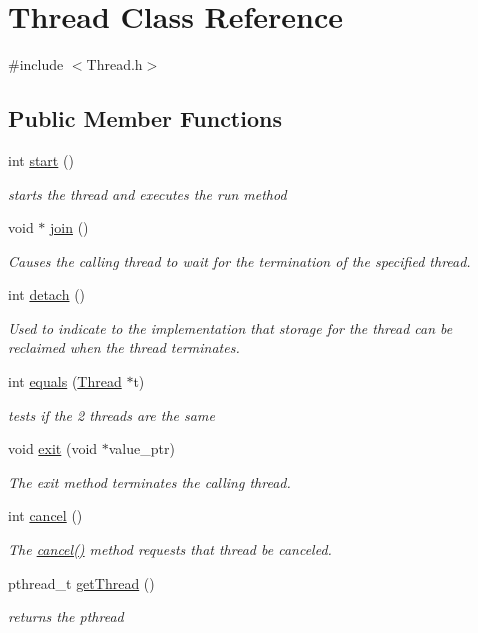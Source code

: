\hypertarget{class_thread}{
\section{\-Thread \-Class \-Reference}
\label{class_thread}
}


{\ttfamily \#include $<$\-Thread.\-h$>$}

\subsection*{\-Public \-Member \-Functions}
\begin{DoxyCompactItemize}
\item 
int \hyperlink{class_thread_a7d563f3201d081af8cc24ea552c6a4e4}{start} ()
\begin{DoxyCompactList}\small\item\em starts the thread and executes the run method \end{DoxyCompactList}\item 
void $\ast$ \hyperlink{class_thread_a9fc97f64df2c041f08f01e8ade638046}{join} ()
\begin{DoxyCompactList}\small\item\em \-Causes the calling thread to wait for the termination of the specified thread. \end{DoxyCompactList}\item 
int \hyperlink{class_thread_a2a08036a4598cfc554114fee9d0e8485}{detach} ()
\begin{DoxyCompactList}\small\item\em \-Used to indicate to the implementation that storage for the thread can be reclaimed when the thread terminates. \end{DoxyCompactList}\item 
int \hyperlink{class_thread_af10ab7827d62665de0ebc5afbfcf1109}{equals} (\hyperlink{class_thread}{\-Thread} $\ast$t)
\begin{DoxyCompactList}\small\item\em tests if the 2 threads are the same \end{DoxyCompactList}\item 
void \hyperlink{class_thread_a64bc90df36e89fc85705cb6c35c9a81a}{exit} (void $\ast$value\-\_\-ptr)
\begin{DoxyCompactList}\small\item\em \-The exit method terminates the calling thread. \end{DoxyCompactList}\item 
int \hyperlink{class_thread_ae2c546a555661d19d7e06d7e1d44b6e6}{cancel} ()
\begin{DoxyCompactList}\small\item\em \-The \hyperlink{class_thread_ae2c546a555661d19d7e06d7e1d44b6e6}{cancel()} method requests that thread be canceled. \end{DoxyCompactList}\item 
pthread\-\_\-t \hyperlink{class_thread_aba840d6f1720be0c074b5a0d229d95f3}{get\-Thread} ()
\begin{DoxyCompactList}\small\item\em returns the pthread \end{DoxyCompactList}\end{DoxyCompactItemize}
